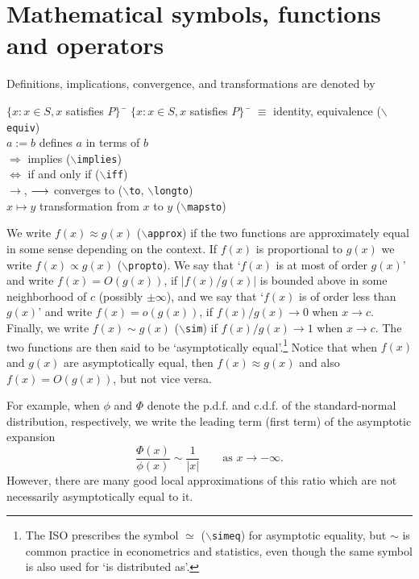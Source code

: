 \documentclass[11pt,dvips,a4paper]{article}
\newcommand{\hspacesymbols}%
   {$\{x: x \in S, x$ satisfies $P\}\;\;$} %
\newcommand{\type}[1]{{\tt$\backslash$#1}}
\begin{document}
\section{Mathematical symbols, functions and operators}
Definitions, implications, convergence, and transformations are denoted by
\begin{tabbing}
\hspacesymbols \= \hspacesymbols\qquad\quad \=  \kill
$\equiv$ \> identity, equivalence (\type{equiv}) \\
$a:=b$ \> defines $a$ in terms of $b$ \\
$\Longrightarrow$ \> implies (\type{implies})\\
$\Longleftrightarrow$ \> if and only if (\type{iff})\\
$\to$, $\longrightarrow$ \> converges to (\type{to}, \type{longto}) \\
$x\mapsto y$ \> transformation from $x$ to $y$ (\type{mapsto})
\end{tabbing}
We write $f(x)\approx g(x)$ (\type{approx}) if the two functions
are approximately equal in some sense depending on the context.
If $f(x)$ is proportional to $g(x)$ we write
$f(x)\propto g(x)$ (\type{propto}).
We say that `$f(x)$ is at most of order $g(x)$' and write
$f(x)=O(g(x))$, if $|f(x)/g(x)|$ is bounded above in some
neighborhood of $c$ (possibly $\pm\infty$), and we say that
`$f(x)$ is of order less than $g(x)$' and write
$f(x)=o(g(x))$, if $f(x)/g(x)\to 0$ when $x\to c$.
Finally, we write $f(x)\sim g(x)$ (\type{sim}) if
$f(x)/g(x)\to 1$ when $x\to c$. The two functions are then said
to be `asymptotically equal'.\footnote{The ISO
prescribes the symbol $\simeq$ (\type{simeq}) for asymptotic equality,
but $\sim$ is common practice in econometrics and statistics,
even though the same symbol is also
used for `is distributed as'.}
Notice that when $f(x)$ and $g(x)$ are asymptotically equal, then
$f(x)\approx g(x)$ and also $f(x)=O(g(x))$, but not vice versa.

For example, when $\phi$ and $\Phi$ denote the p.d.f. and c.d.f. of the
standard-normal distribution, respectively, we write
the leading term (first term) of the asymptotic expansion
$$
\frac{\Phi(x)}{\phi(x)}\sim \frac{1}{|x|}\qquad \text{as } x\to -\infty.
$$
However, there are many good local approximations of this ratio which
are not necessarily asymptotically equal to it.
\end{document}
